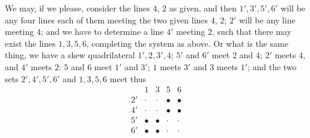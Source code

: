 \documentclass[11pt,a4paper]{article}
\begin{document}
We may, if we please, consider the lines $4$, $2$ as given, and then
$1', 3', 5', 6'$ will be any four lines each of them meeting the two
given lines $4$, $2$; $2'$ will be any line meeting $4$; and we have to
determine a line $4'$ meeting $2$, such that there may exist the lines
$1, 3, 5, 6$, completing the system as above. Or what is the same thing,
we have a skew quadrilateral $1', 2, 3', 4$; $5'$ and $6'$ meet $2$ and
$4$; $2'$ meets $4$, and $4'$ meets $2$: $5$ and $6$ meet $1'$ and $3'$;
$1$ meets $3'$ and $3$ meets $1'$; and the two sets $2', 4', 5', 6'$ and
$1, 3, 5, 6$ meet thus
\[
\begin{array}{c|cccc}
   & 1 & 3 & 5 & 6 \\\hline
2' & \cdot & \cdot & \bullet & \bullet \\
4' & \cdot & \cdot & \bullet & \bullet \\
5' & \bullet & \bullet & \cdot & \cdot \\
6' & \bullet & \bullet & \cdot & \cdot
\end{array}
\]
\end{document}
